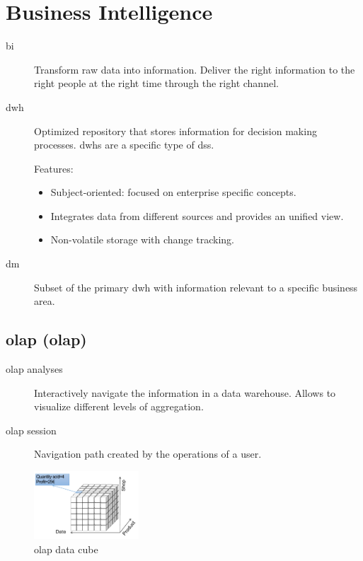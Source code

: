 \chapter{Business Intelligence}


\begin{description}
    \item[\Acl{bi}] 
        Transform raw data into information.
        Deliver the right information to the right people at the right time through the right channel.

    \item[\Ac{dwh}] 
        Optimized repository that stores information for decision making processes.
        \Acp{dwh} are a specific type of \ac{dss}.

        Features:
        \begin{itemize}
            \item Subject-oriented: focused on enterprise specific concepts.
            \item Integrates data from different sources and provides an unified view.
            \item Non-volatile storage with change tracking. 
        \end{itemize}

    \item[\Ac{dm}] 
        Subset of the primary \ac{dwh} with information relevant to a specific business area.
\end{description}



\section{\Acl{olap} (\Ac{olap})}

\begin{description}
    \item[\ac{olap} analyses] 
        Interactively navigate the information in a data warehouse.
        Allows to visualize different levels of aggregation.

    \item[\ac{olap} session] 
        Navigation path created by the operations of a user.
\end{description}

\begin{figure}[ht]
    \centering
    \includegraphics[width=0.35\textwidth]{img/_olap_cube.pdf}
    \caption{\ac{olap} data cube}
\end{figure}


